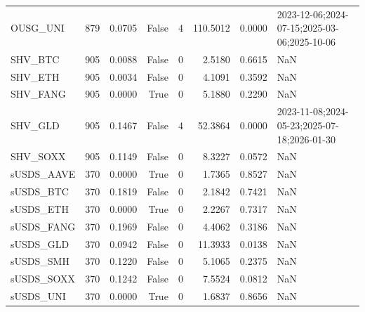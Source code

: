 \begin{tabular}{lrrrrrrl}
OUSG\_UNI & 879 & 0.0705 & False & 4 & 110.5012 & 0.0000 & 2023-12-06;2024-07-15;2025-03-06;2025-10-06 \\
SHV\_BTC & 905 & 0.0088 & False & 0 & 2.5180 & 0.6615 & NaN \\
SHV\_ETH & 905 & 0.0034 & False & 0 & 4.1091 & 0.3592 & NaN \\
SHV\_FANG & 905 & 0.0000 & True & 0 & 5.1880 & 0.2290 & NaN \\
SHV\_GLD & 905 & 0.1467 & False & 4 & 52.3864 & 0.0000 & 2023-11-08;2024-05-23;2025-07-18;2026-01-30 \\
SHV\_SOXX & 905 & 0.1149 & False & 0 & 8.3227 & 0.0572 & NaN \\
sUSDS\_AAVE & 370 & 0.0000 & True & 0 & 1.7365 & 0.8527 & NaN \\
sUSDS\_BTC & 370 & 0.1819 & False & 0 & 2.1842 & 0.7421 & NaN \\
sUSDS\_ETH & 370 & 0.0000 & True & 0 & 2.2267 & 0.7317 & NaN \\
sUSDS\_FANG & 370 & 0.1969 & False & 0 & 4.4062 & 0.3186 & NaN \\
sUSDS\_GLD & 370 & 0.0942 & False & 0 & 11.3933 & 0.0138 & NaN \\
sUSDS\_SMH & 370 & 0.1220 & False & 0 & 5.1065 & 0.2375 & NaN \\
sUSDS\_SOXX & 370 & 0.1242 & False & 0 & 7.5524 & 0.0812 & NaN \\
sUSDS\_UNI & 370 & 0.0000 & True & 0 & 1.6837 & 0.8656 & NaN \\
\bottomrule
\end{tabular}
